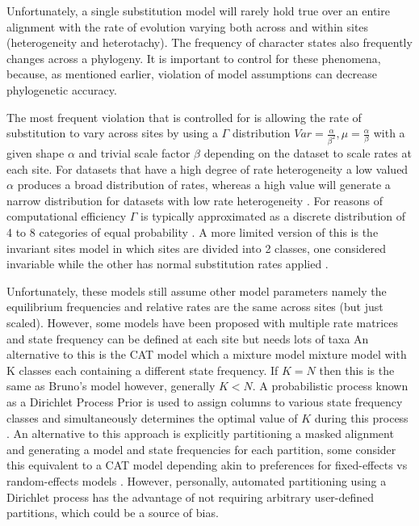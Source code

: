 Unfortunately, a single substitution model will rarely hold true over an entire
alignment with the rate of evolution varying both across and within sites (heterogeneity
and heterotachy). The frequency of character states also frequently changes
across a phylogeny.  It is important to control for these phenomena, because, 
as mentioned earlier, violation of model assumptions can decrease phylogenetic
accuracy.


The most frequent violation that is controlled for is allowing the rate of substitution to vary across
sites by using a \(\Gamma\) distribution \(Var = \frac{\alpha}{\beta^{2}}, \mu = \frac{\alpha}{\beta}\) with a given shape \(\alpha\) and 
trivial scale factor \(\beta\) depending on the dataset to scale rates at each site.
For datasets that have a high degree of rate heterogeneity a low valued \(\alpha\) produces a broad distribution of rates, whereas a high value will generate 
a narrow distribution for datasets with low rate heterogeneity \citep{Yang1993}.
For reasons of computational efficiency \(\Gamma\) is typically approximated as a discrete distribution of 4 to 8 
categories of equal probability \citep{Yang1994a}. 
A more limited version of this is the invariant sites model in which sites are divided into 2 classes, one considered invariable while the 
other has normal substitution rates applied \citep{Hasegawa1985}.


Unfortunately, these models still assume other model parameters namely the equilibrium frequencies and relative rates are the same across
sites (but just scaled).  
However, some models have been proposed with multiple rate matrices \citep{Lartillot2004} and 
state frequency can be defined at each site \citep{Bruno1996} but needs lots of taxa \citep{Lartillot2004}
An alternative to this is the CAT model which a mixture model mixture model with 
K classes each containing a different state frequency.  If \(K=N\) then this is
the same as Bruno's model however, generally \(K < N\).  A 
 probabilistic process known as a Dirichlet Process Prior is used to assign
 columns to various state frequency classes and simultaneously
 determines the optimal value of \(K\) during this process \citep{Lartillot2004}.
An alternative to this approach is explicitly partitioning a masked alignment
and generating a model and state frequencies for each partition, 
some consider this equivalent to a CAT model depending akin to preferences
for fixed-effects vs random-effects models \citep{Yang2012}.  However, personally,
automated partitioning using a Dirichlet process has the advantage of not
requiring arbitrary user-defined partitions, which could be a source of bias.


